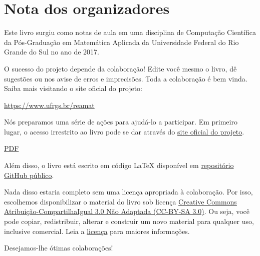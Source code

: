 
\chapter*{Nota dos organizadores}

Este livro surgiu como notas de aula em uma disciplina de Computação Científica da Pós-Graduação em Matemática Aplicada da Universidade Federal do Rio Grande do Sul no ano de 2017.

O sucesso do projeto depende da colaboração! Edite você mesmo o livro, dê sugestões ou nos avise de erros e imprecisões. Toda a colaboração é bem vinda. Saiba mais visitando o site oficial do projeto:
\begin{center}
  \url{https://www.ufrgs.br/reamat}
\end{center}

Nós preparamos uma série de ações para ajudá-lo a participar. Em primeiro lugar, o acesso irrestrito ao livro pode se dar através do \href{https://www.ufrgs.br/reamat/computacao}{site oficial do projeto}.

 \href{https://www.ufrgs.br/reamat/computacao/main.pdf}{PDF}


Além disso, o livro está escrito em código \LaTeX{} disponível em \href{https://github.com/reamat/ComputacaoCientifica}{repositório GitHub público}.

Nada disso estaria completo sem uma licença apropriada à colaboração. Por isso, escolhemos disponibilizar o material do livro sob licença \href{https://creativecommons.org/licenses/by-sa/3.0/}{Creative Commons Atribuição-CompartilhaIgual 3.0 Não Adaptada (CC-BY-SA 3.0)}. Ou seja, você pode copiar, redistribuir, alterar e construir um novo material para qualquer uso, inclusive comercial. Leia a \href{https://creativecommons.org/licenses/by-sa/3.0/}{licença} para maiores informações.

\vspace{0.5cm}

Desejamos-lhe ótimas colaborações!
